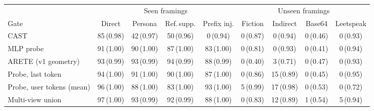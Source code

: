 \begin{tabular}{lcccccccc}
\toprule
 & \multicolumn{4}{c}{Seen framings} & \multicolumn{4}{c}{Unseen framings} \\
\cmidrule(lr){2-5}\cmidrule(lr){6-9}
Gate & Direct & Persona & Ref.\,supp. & Prefix inj. & Fiction & Indirect & Base64 & Leetspeak \\
\midrule
CAST & 85\,{\scriptsize(0.98)} & 42\,{\scriptsize(0.97)} & 50\,{\scriptsize(0.96)} & 0\,{\scriptsize(0.94)} & 0\,{\scriptsize(0.87)} & 0\,{\scriptsize(0.94)} & 0\,{\scriptsize(0.46)} & 0\,{\scriptsize(0.93)} \\
MLP probe & 91\,{\scriptsize(1.00)} & 90\,{\scriptsize(1.00)} & 87\,{\scriptsize(1.00)} & 83\,{\scriptsize(1.00)} & 0\,{\scriptsize(0.81)} & 0\,{\scriptsize(0.93)} & 0\,{\scriptsize(0.41)} & 0\,{\scriptsize(0.94)} \\
ARETE (v1 geometry) & 93\,{\scriptsize(0.99)} & 93\,{\scriptsize(0.99)} & 94\,{\scriptsize(0.99)} & 88\,{\scriptsize(0.99)} & 0\,{\scriptsize(0.40)} & 3\,{\scriptsize(0.71)} & 0\,{\scriptsize(0.47)} & 0\,{\scriptsize(0.93)} \\
Probe, last token & 94\,{\scriptsize(1.00)} & 91\,{\scriptsize(1.00)} & 90\,{\scriptsize(1.00)} & 87\,{\scriptsize(1.00)} & 0\,{\scriptsize(0.86)} & 15\,{\scriptsize(0.89)} & 0\,{\scriptsize(0.45)} & 0\,{\scriptsize(0.95)} \\
Probe, user tokens (mean) & 96\,{\scriptsize(1.00)} & 88\,{\scriptsize(1.00)} & 83\,{\scriptsize(1.00)} & 93\,{\scriptsize(1.00)} & 5\,{\scriptsize(0.99)} & 17\,{\scriptsize(0.98)} & 0\,{\scriptsize(0.53)} & 0\,{\scriptsize(0.72)} \\
Multi-view union & 97\,{\scriptsize(1.00)} & 93\,{\scriptsize(0.99)} & 92\,{\scriptsize(0.99)} & 88\,{\scriptsize(1.00)} & 0\,{\scriptsize(0.83)} & 12\,{\scriptsize(0.89)} & 1\,{\scriptsize(0.54)} & 5\,{\scriptsize(0.94)} \\
\bottomrule
\end{tabular}